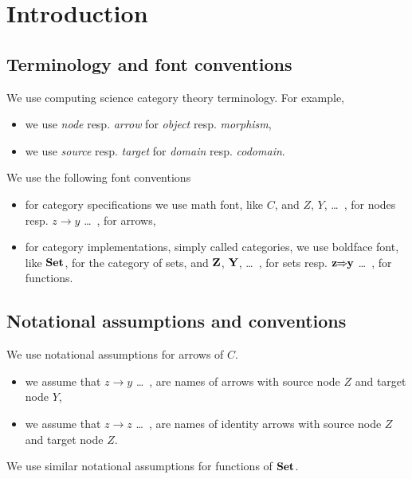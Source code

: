 \documentclass[journal]{journal}
\newcommand{\arrow}[2]{#1\!\!\rightarrow\!\!#2}
\newcommand{\function}[2]{\mbox{\bf #1} \!\!\Rightarrow\!\! \mbox{\bf #2}}
\newcommand{\Z}{\mbox{\bf Z}}
\newcommand{\Y}{\mbox{\bf Y}}
\newcommand{\Set}{\mbox{\bf Set}}
\begin{document}
\section{Introduction}\label{sec:introduction}

\subsection{Terminology and font conventions}\label{subsec:terminologynotationalconventions}

We use computing science category theory terminology. For example, 
\begin{itemize}
\item we use {\em node} resp.\! {\em arrow} for {\em object} resp.\! {\em morphism},
\item we use {\em source} resp.\! {\em target} for {\em domain}
resp.\! {\em codomain}.     
\end{itemize}

We use the following font conventions
\begin{itemize}
\item for category specifications we use math font, like $C$, and $Z$, $Y$, \ldots\, , for nodes resp.
$\arrow{z}{y}$ \ldots\, , for arrows,
\item for category implementations, simply called categories, we use boldface font, like $\Set$, for the category of
sets, and $\Z$, $\Y$, \ldots\, , for sets resp. $\function{z}{y}$ \ldots\, , for functions.
\end{itemize}

\subsection{Notational assumptions and conventions}\label{subsec:notationalassumptionsandconvention}

We use notational assumptions for arrows of $C$.
\begin{itemize}
\item we assume that $\arrow{z}{y}$ \ldots\, , are names of arrows with source node $Z$ and target node $Y$,
\item we assume that $\arrow{z}{z}$ \ldots\, , are names of identity arrows with source node $Z$ and target node $Z$.           
\end{itemize} 

We use similar notational assumptions for functions of $\Set$.
\end{document}
